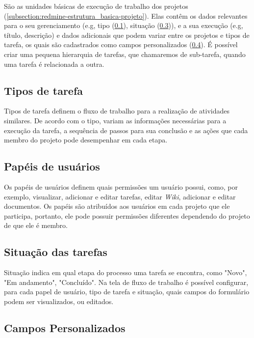 São as unidades básicas de execução de trabalho dos projetos (\ref{subsection:redmine-estrutura_basica-projeto}). Elas contêm os dados relevantes para o seu gerenciamento (e.g, tipo (\ref{subsection:redmine-estrutura_basica-tracker}), situação (\ref{subsection:redmine-estrutura_basica-status})), e a sua execução (e.g, título, descrição) e dados adicionais que podem variar entre os projetos e tipos de tarefa, os quais são cadastrados como campos personalizados (\ref{subsection:redmine-estrutura_basica-custom_fields}). É possível criar uma pequena hierarquia de tarefas, que chamaremos de sub-tarefa, quando uma tarefa é relacionada a outra.

\subsection{Tipos de tarefa}\label{subsection:redmine-estrutura_basica-tracker}

Tipos de tarefa definem o fluxo de trabalho para a realização de atividades similares. De acordo com o tipo, variam as informações necessárias para a execução da tarefa, a sequência de passos para sua conclusão e as ações que cada membro do projeto pode desempenhar em cada etapa.

\subsection{Papéis de usuários}\label{subsection:redmine-estrutura_basica-role}

Os papéis de usuários definem quais permissões um usuário possui, como, por exemplo, visualizar, adicionar e editar tarefas, editar \textit{Wiki}, adicionar e editar documentos. Os papéis são atribuídos aos usuários em cada projeto que ele participa, portanto, ele pode possuir permissões diferentes dependendo do projeto de que ele é membro.

\subsection{Situação das tarefas}\label{subsection:redmine-estrutura_basica-status}

Situação indica em qual etapa do processo uma tarefa se encontra, como "Novo", "Em andamento", "Concluído". Na tela de fluxo de trabalho é possível configurar, para cada papel de usuário, tipo de tarefa e situação, quais campos do formulário podem ser visualizados, ou editados.

\subsection{Campos Personalizados}\label{subsection:redmine-estrutura_basica-custom_fields}

